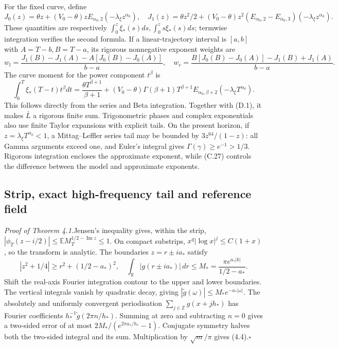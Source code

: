 \documentclass[11pt,a4paper]{article}
\newcommand{\proofhead}[1]{\par\addvspace{0.3\baselineskip}\noindent\textit{#1.}\enspace}
\newcommand{\proofend}{\hfill\(\square\)\par\addvspace{0.6\baselineskip}}
\begin{document}
For the fixed curve, define
\begin{equation*}\tag{D.10}
J_0(z)=\theta z+(V_0-\theta)zE_{\alpha_0,2}(-\lambda_\xi z^{\alpha_0}),\quad
J_1(z)=\theta z^2/2+
(V_0-\theta)z^2(E_{\alpha_0,2}-E_{\alpha_0,3})(-\lambda_\xi z^{\alpha_0}).
\end{equation*}
These quantities are respectively \(\int_0^z\xi_*(s)ds,\int_0^zs\xi_*(s)ds\); termwise integration verifies the second formula. If a linear-trajectory interval is \([a,b]\) with \(A=T-b,B=T-a\), its rigorous nonnegative exponent weights are
\begin{equation*}\tag{D.11}
w_l=\frac{J_1(B)-J_1(A)-A[J_0(B)-J_0(A)]}{b-a},\quad
w_r=\frac{B[J_0(B)-J_0(A)]-J_1(B)+J_1(A)}{b-a}.
\end{equation*}
The curve moment for the power component \(t^\beta\) is
\begin{equation*}\tag{D.12}
\int_0^T\xi_*(T-t)t^\beta dt
=\frac{\theta T^{\beta+1}}{\beta+1}
 +(V_0-\theta)\Gamma(\beta+1)T^{\beta+1}
 E_{\alpha_0,\beta+2}(-\lambda_\xi T^{\alpha_0}).
\end{equation*}
This follows directly from the series and Beta integration. Together with (D.1), it makes \(\bar L\) a rigorous finite sum. Trigonometric phases and complex exponentials also use finite Taylor expansions with explicit tails. On the present horizon, if \(z=\lambda_\xi T^{\alpha_0}<1\), a Mittag–Leffler series tail may be bounded by \(3z^{64}/(1-z)\): all Gamma arguments exceed one, and Euler's integral gives \(\Gamma(\gamma)\ge e^{-1}>1/3\). Rigorous integration encloses the approximate exponent, while (C.27) controls the difference between the model and approximate exponents.

\setcounter{subsection}{1}\subsection{Strip, exact high-frequency tail and reference field}

\proofhead{Proof of Theorem 4.1}Jensen's inequality gives, within the strip,
\(|\phi_T(z-i/2)|\le\mathbb E M_T^{1/2-\operatorname{Im}z}\le1\).
On compact substrips, \(x^q|\log x|^j\le C(1+x)\), so the transform is analytic. The boundaries \(z=r\pm ia_*\) satisfy
\[
|z^2+1/4|\ge r^2+(1/2-a_*)^2,\quad
\int_{\mathbb R}|g(r\pm ia_*)|\,dr
\le M_*=\frac{\pi e^{a_*|k|}}{1/2-a_*}.
\]
Shift the real-axis Fourier integration contour to the upper and lower boundaries. The vertical integrals vanish by quadratic decay, giving
\(|\widetilde g(\omega)|\le M_*e^{-a_*|\omega|}\).
The absolutely and uniformly convergent periodisation \(\sum_{j\in\mathbb Z}g(x+jh_*)\) has Fourier coefficients
\(h_*^{-1}\widetilde g(2\pi n/h_*)\). Summing at zero and subtracting \(n=0\) gives a two-sided error of at most
\(2M_* /(e^{2\pi a_*/h_*}-1)\).
Conjugate symmetry halves both the two-sided integral and its sum. Multiplication by \(\sqrt m/\pi\) gives (4.4).\proofend
\end{document}

